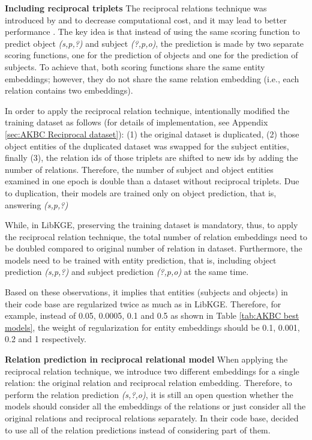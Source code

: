 \noindent\textbf{Including reciprocal triplets}
The reciprocal relations technique was introduced by \citet{kazemi2018simple} and \citet{lacroix2018canonical} to decrease computational cost, and it may lead to better performance \citep{lacroix2018canonical}. The key idea is that instead of using the same scoring function to predict object \textit{(s,p,?)} and subject \textit{(?,p,o)}, the prediction is made by two separate scoring functions, one for the prediction of objects and one for the prediction of subjects. To achieve that, both scoring functions share the same entity embeddings; however, they do not share the same relation embedding (i.e., each relation contains two embeddings).

In order to apply the reciprocal relation technique, \citet{chen2021relation} intentionally modified the training dataset as follows (for details of implementation, see Appendix \ref{sec:AKBC Reciprocal dataset}): (1) the original dataset is duplicated, (2) those object entities of the duplicated dataset was swapped for the subject entities, finally (3), the relation ids of those triplets are shifted to new ids by adding the number of relations. Therefore, the number of subject and object entities examined in one epoch is double than a dataset without reciprocal triplets. Due to duplication, their models are trained only on object prediction, that is, answering \textit{(s,p,?)}

While, in LibKGE, preserving the training dataset is mandatory, thus, to apply the reciprocal relation technique, the total number of relation embeddings need to be doubled compared to original number of relation in dataset. Furthermore, the models need to be trained with entity prediction, that is, including object prediction \textit{(s,p,?)} and subject prediction \textit{(?,p,o)} at the same time. 


Based on these observations, it implies that entities (subjects and objects) in their code base are regularized twice as much as in LibKGE. Therefore, for example, instead of 0.05, 0.0005, 0.1 and 0.5 as shown in Table \ref{tab:AKBC best models}, the weight of regularization for entity embeddings should be 0.1, 0.001, 0.2 and 1 respectively.
\newline

\noindent\textbf{Relation prediction in reciprocal relational model}
When applying the reciprocal relation technique, we introduce two different embeddings for a single relation: the original relation and reciprocal relation embedding. Therefore, to perform the relation prediction \textit{(s,?,o)}, it is still an open question whether the models should consider all the embeddings of the relations or just consider all the original relations and reciprocal relations separately. In their code base, \citet{chen2021relation} decided to use all of the relation predictions instead of considering part of them.  

